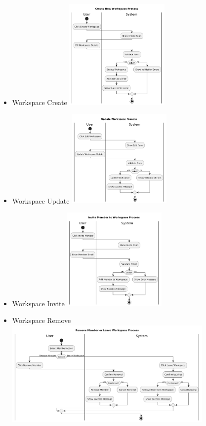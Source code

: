 \begin{itemize}
  \item Workspace Create
  \newline
  \includegraphics[width=0.4\textwidth]{assets/activity_diagrams/workspace_create.png}
  \item Workspace Update
  \newline
  \includegraphics[width=0.4\textwidth]{assets/activity_diagrams/workspace_update.png}
  \item Workspace Invite
  \newline
  \includegraphics[width=0.4\textwidth]{assets/activity_diagrams/workspace_invite.png}
  \item Workspace Remove
  \newline
  \includegraphics[width=0.8\textwidth]{assets/activity_diagrams/workspace_remove.png}

\end{itemize}
